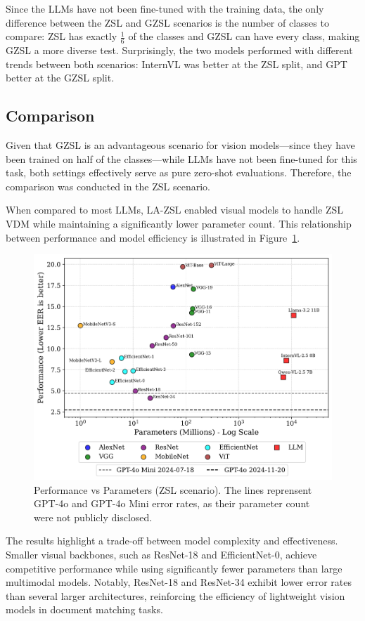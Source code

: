 Since the \glspl{LLM} have not been fine-tuned with the training data, the only difference between the \gls{ZSL} and \gls{GZSL} scenarios is the number of classes to compare: \gls{ZSL} has exactly $\frac{1}{6}$ of the classes and \gls{GZSL} can have every class, making \gls{GZSL} a more diverse test. Surprisingly, the two models performed with different trends between both scenarios: InternVL was better at the \gls{ZSL} split, and GPT better at the \gls{GZSL} split.

\subsection{Comparison}
\label{sec:comparison_result}

Given that \gls{GZSL} is an advantageous scenario for vision models—since they have been trained on half of the classes—while \glspl{LLM} have not been fine-tuned for this task, both settings effectively serve as pure zero-shot evaluations. Therefore, the comparison was conducted in the \gls{ZSL} scenario.

When compared to most \glspl{LLM}, \gls{LA-ZSL} enabled visual models to handle \gls{ZSL} \gls{VDM} while maintaining a significantly lower parameter count. This relationship between performance and model efficiency is illustrated in Figure~\ref{fig:performance}.

\begin{figure}[htbp]
\centering
\includegraphics[width=1\linewidth]{images/performance_vs_parameters.png}
\caption{Performance vs Parameters (\acrlong{ZSL} scenario)\label{fig:performance}. The lines reprensent GPT-4o and GPT-4o Mini error rates, as their parameter count were not publicly disclosed.}
\end{figure}  

The results highlight a trade-off between model complexity and effectiveness. Smaller visual backbones, such as ResNet-18 and EfficientNet-0, achieve competitive performance while using significantly fewer parameters than large multimodal models. Notably, ResNet-18 and ResNet-34 exhibit lower error rates than several larger architectures, reinforcing the efficiency of lightweight vision models in document matching tasks.

